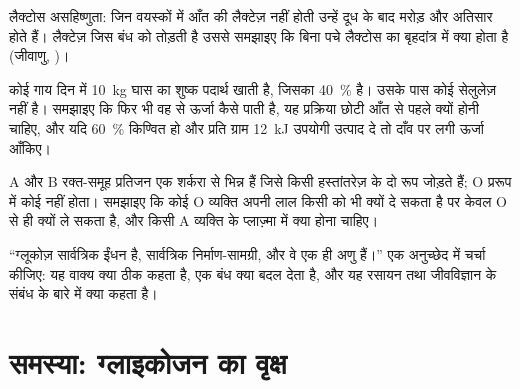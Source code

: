 \begin{exercise}[$\star\star$]\label{exo:b1:carbohydrates:9}
लैक्टोस असहिष्णुता: जिन वयस्कों में आँत की लैक्टेज़ नहीं होती उन्हें दूध
के बाद मरोड़ और अतिसार होते हैं। लैक्टेज़ जिस बंध को तोड़ती है उससे
समझाइए कि बिना पचे लैक्टोस का बृहदांत्र में क्या होता है (जीवाणु,
)।
\end{exercise}

\begin{exercise}[$\star\star\star$]\label{exo:b1:carbohydrates:10}
कोई गाय दिन में \qty{10}{kg} घास का शुष्क पदार्थ खाती है, जिसका
\qty{40}{\%}  है। उसके पास कोई सेलुलेज़ नहीं है। समझाइए कि फिर भी
वह  से ऊर्जा कैसे पाती है, यह प्रक्रिया छोटी आँत से पहले क्यों
होनी चाहिए, और यदि \qty{60}{\%}  किण्वित हो और प्रति ग्राम
\qty{12}{kJ} उपयोगी उत्पाद दे तो दाँव पर लगी ऊर्जा आँकिए।
\end{exercise}

\begin{exercise}[$\star\star\star$]\label{exo:b1:carbohydrates:11}
A और B रक्त-समूह प्रतिजन एक शर्करा से भिन्न हैं जिसे किसी
हस्तांतरेज़ के दो रूप जोड़ते हैं; O प्ररूप में कोई नहीं होता। समझाइए कि
कोई O व्यक्ति अपनी लाल  किसी को भी क्यों दे सकता है पर केवल O से
ही क्यों ले सकता है, और किसी A व्यक्ति के प्लाज़्मा में क्या होना चाहिए।
\end{exercise}

\begin{exercise}[$\star\star\star$]\label{exo:b1:carbohydrates:12}
``ग्लूकोज़ सार्वत्रिक ईंधन है,  सार्वत्रिक निर्माण-सामग्री, और वे
एक ही अणु हैं।'' एक अनुच्छेद में चर्चा कीजिए: यह वाक्य क्या ठीक कहता है,
एक बंध क्या बदल देता है, और यह रसायन तथा जीवविज्ञान के संबंध के बारे में
क्या कहता है।
\end{exercise}

\section{समस्या: ग्लाइकोजन का वृक्ष}

